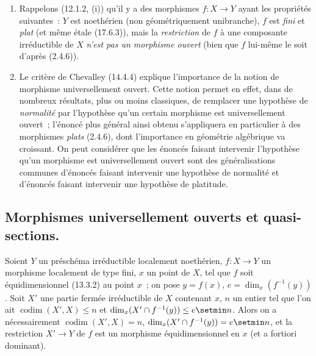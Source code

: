 \begin{remarks}[14.4.10]
\begin{enumerate}[label=(\roman*)]
  Rappelons toutefois (12.1.1.5) que si $Y$ est localement noethérien, $f:X\to Y$
  de type fini et \emph{plat}, alors toute composante irréductible de $X$ est
  \emph{équidimensionnelle} sur $Y$ (et par suite la restriction de $f$ à une telle
  composante est \emph{universellement ouverte} si tous les points de $Y$ sont
  \emph{géométriquement unibranches}).

  \item Rappelons (12.1.2, (i)) qu'il y a des morphismes $f:X\to Y$ ayant les
  propriétés suivantes~: $Y$ est noethérien (non géométriquement unibranche), $f$
  est \emph{fini} et \emph{plat} (et même étale (17.6.3)), mais la \emph{restriction} de $f$ à une
  composante irréductible de $X$ \emph{n'est pas un morphisme ouvert} (bien que $f$
  lui-même le soit d'après (2.4.6)).

  \item Le critère de Chevalley (14.4.4) explique l'importance de la notion de
  morphisme universellement ouvert. Cette notion permet en effet, dans de nombreux
  résultats, plus ou moins classiques, de remplacer une hypothèse de \emph{normalité}
  par l'hypothèse qu'un certain morphisme est universellement ouvert~; l'énoncé plus
  général
  ainsi obtenu s'appliquera en particulier à des morphismes \emph{plats} (2.4.6),
  dont l'importance en géométrie algébrique va croissant. On peut considérer que
  les énoncés faisant intervenir l'hypothèse qu'un morphisme est universellement
  ouvert sont des généralisations communes d'énoncés faisant intervenir une
  hypothèse de normalité et d'énoncés faisant intervenir une hypothèse de platitude.
\end{enumerate}
\end{remarks}

\subsection{Morphismes universellement ouverts et quasi-sections.}
\label{subsection:IV.14.5-fr}

\begin{lemma}[14.5.1]
\label{IV.14.5.1-fr}
Soient $Y$ un préschéma irréductible localement noethérien, $f:X\to Y$ un
morphisme localement de type fini, $x$ un point de $X$, tel que $f$ soit
équidimensionnel \textup{(13.3.2)} au point $x$~; on pose $y=f(x)$,
$e=\dim_x(f^{-1}(y))$. Soit $X'$ une partie fermée irréductible de $X$ contenant
$x$, $n$ un entier tel que l'on ait $\operatorname{codim}(X',X)\leq n$ et
$\dim_x(X'\cap f^{-1}(y))\leq e\setmin n$. Alors on a nécessairement
$\operatorname{codim}(X',X)=n$, $\dim_x(X'\cap f^{-1}(y))=e\setmin n$, et la restriction $X'\to Y$
de $f$ est un morphisme équidimensionnel en $x$ (et \textup{a fortiori} dominant).
\end{lemma}

